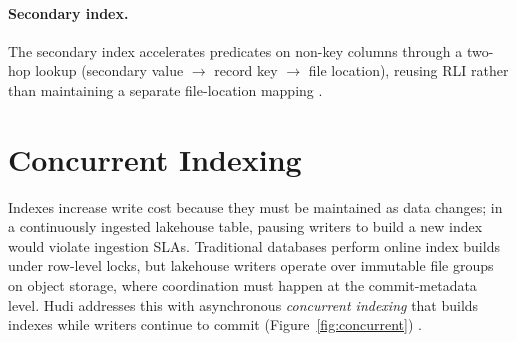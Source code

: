 \documentclass[sigconf]{acmart}
\begin{document}
\paragraph{Secondary index.}
The secondary index accelerates predicates on non-key columns through a two-hop lookup (secondary value $\rightarrow$ record key $\rightarrow$ file location), reusing RLI rather than maintaining a separate file-location mapping \cite{hudi-techspec}.

\section{Concurrent Indexing}
\label{sec:concurrent}

Indexes increase write cost because they must be maintained as data changes; in a continuously ingested lakehouse table, pausing writers to build a new index would violate ingestion SLAs.
Traditional databases perform online index builds under row-level locks, but lakehouse writers operate over immutable file groups on object storage, where coordination must happen at the commit-metadata level.
Hudi addresses this with asynchronous \emph{concurrent indexing} that builds indexes while writers continue to commit (Figure~\ref{fig:concurrent}) \cite{hudi-indexing}.
\end{document}

